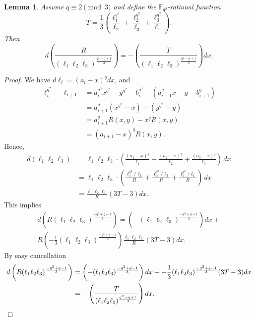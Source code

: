 \documentclass[11pt]{amsart}
\theoremstyle{plain}
\newtheorem{lemma}[theorem]{Lemma}
\theoremstyle{definition}
\theoremstyle{remark}
\newcommand{\R}{\mathbb{R}}
\begin{document}
\begin{lemma}
Assume $q\equiv 2 \pmod3$ and define the $\mathbb{F}_{q^2}$-rational function 
\[T=\frac{1}{3}\left(\frac{\ell_1^{q^2}}{\ell_2} + \frac{\ell_2^{q^2}}{\ell_3} + \frac{\ell_3^{q^2}}{\ell_1}\right).\]
Then
\[d\left(\frac{R}{(\ell_1\ell_{2}\ell_{3})^{\frac{q^2-q+1}{3}}}\right) = - \left(\frac{T}{(\ell_1\ell_{2}\ell_{3})^{\frac{q^2-q+1}{3}}}\right) dx.\]
\end{lemma}
\begin{proof}
We have $d\ell_i=(a_i-x)^q dx$, and
\begin{align*}
\ell_i^{q^2}-\ell_{i+1} &= a_i^{q^3}x^{q^2}-y^{q^2}-b_i^{q^3}-(a_{i+1}^{q}x-y-b_{i+1}^{q}) \\
&= a_{i+1}^q(x^{q^2}-x)-(y^{q^2}-y) \\
&= a_{i+1}^q R(x,y) - x^q R(x,y) \\
&= (a_{i+1}-x)^q R(x,y).
\end{align*}
Hence,
\begin{align*}
d(\ell_1\ell_{2}\ell_{3}) & = \ell_1\ell_{2}\ell_{3} \cdot \left( \frac{(a_1-x)^q}{\ell_1} + \frac{(a_2-x)^q}{\ell_2} + \frac{(a_3-x)^q}{\ell_3}\right)\, dx \\
&= \ell_1\ell_{2}\ell_{3} \cdot \left( \frac{\ell_1^{q^2}/\ell_2}{R} + \frac{\ell_2^{q^2}/\ell_3}{R} + \frac{\ell_3^{q^2}/\ell_1}{R}\right)\, dx \\
&= \frac{\ell_1\ell_{2}\ell_{3}}{R}(3T-3)dx.
\end{align*}
This implies
\begin{multline*}
d\left(R(\ell_1\ell_{2}\ell_{3})^{\frac{-q^2+q-1}{3}}\right) =\left( -(\ell_1\ell_{2}\ell_{3})^{\frac{-q^2+q-1}{3}}\right) dx + \\R \left(-\frac{1}{3}(\ell_1\ell_{2}\ell_{3})^{\frac{-q^2+q-4}{3}}\right) \frac{\ell_1\ell_{2}\ell_{3}}{R}(3T-3)dx.
\end{multline*}
By easy cancellation
\begin{align*}
d\left(R(\ell_1\ell_{2}\ell_{3})^{\frac{-q^2+q-1}{3}}\right) &=\left( -(\ell_1\ell_{2}\ell_{3})^{\frac{-q^2+q-1}{3}}\right) dx + -\frac{1}{3}(\ell_1\ell_{2}\ell_{3})^{\frac{-q^2+q-1}{3}} (3T-3)dx\\
&= - \left(\frac{T}{(\ell_1\ell_{2}\ell_{3})^{\frac{q^2-q+1}{3}}}\right) dx. \qedhere
\end{align*}
\end{proof}
\end{document}
